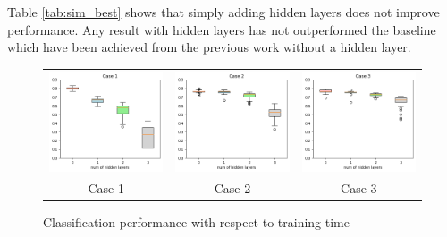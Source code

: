 \documentclass[letterpaper, 10 pt, conference]{ieeeconf}  %
\begin{document}
Table \ref{tab:sim_best} shows that simply adding hidden layers does not improve performance. Any result with hidden layers has not outperformed the baseline which have been achieved from the previous work \cite{hopkins2018spiking} without a hidden layer. 

\begin{figure}[tbh]
    \centering
    \begin{centering}
    \begin{tabular}{ccc}
        \includegraphics[width=0.30\linewidth, trim=0cm 0cm 0cm 0.65cm, clip=true]{10trials/boxPlotHlayersC1}&
        \includegraphics[width=0.30\linewidth, trim=0cm 0cm 0cm 0.65cm, clip=true]{10trials/boxPlotHlayersC2}&
        \includegraphics[width=0.30\linewidth, trim=0cm 0cm 0cm 0.65cm, clip=true]{10trials/boxPlotHlayersC3}\\
        Case 1 & Case 2 & Case 3
        \end{tabular}
     \end{centering}
     \caption{Classification performance with respect to training time}
     \label{fig:bpTtime}
    \vspace{-10pt}
\end{figure}
\end{document}
